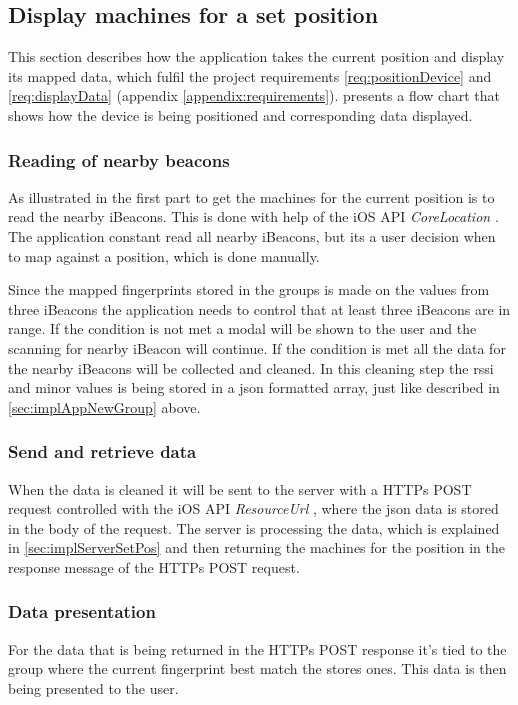 \subsection{Display machines for a set position}\label{sec:implAppSetPos}
This section describes how the application takes the current position and display its mapped data, which fulfil the project requirements \ref{req:positionDevice} and \ref{req:displayData} (appendix \ref{appendix:requirements}).
 presents a flow chart that shows how the device is being positioned and corresponding data displayed.



\subsubsection{Reading of nearby beacons}\label{sec:implAppSetPosReadBeacons}
As illustrated in  the first part to get the machines for the current position is to read the nearby iBeacons.
This is done with help of the iOS API \textit{CoreLocation} \cite{CoreLocationApple}.
The application constant read all nearby iBeacons, but its a user decision when to map against a position, which is done manually.

\bigskip

Since the mapped fingerprints stored in the groups is made on the values from three iBeacons the application needs to control that at least three iBeacons are in range.
If the condition is not met a modal will be shown to the user and the scanning for nearby iBeacon will continue.
If the condition is met all the data for the nearby iBeacons will be collected and cleaned.
In this cleaning step the \acrshort{rssi} and minor values is being stored in a \acrshort{json} formatted array, just like  described in \cref{sec:implAppNewGroup} above.


\subsubsection{Send and retrieve data}\label{sec:implAppSetPosSendRetreiveData}
When the data is cleaned it will be sent to the server with a HTTPs POST request controlled with the iOS API \textit{ResourceUrl} \cite{ResourceURLAppleDeveloper}, where the \acrshort{json} data is stored in the body of the request.
The server is processing the data, which is explained in \cref{sec:implServerSetPos} and then returning the machines for the position in the response message of the HTTPs POST request.


\subsubsection{Data presentation}\label{sec:implAppSetPosShowData}
For the data that is being returned in the HTTPs POST response it's tied to the group where the current fingerprint best match the stores ones.
This data is then being presented to the user.
